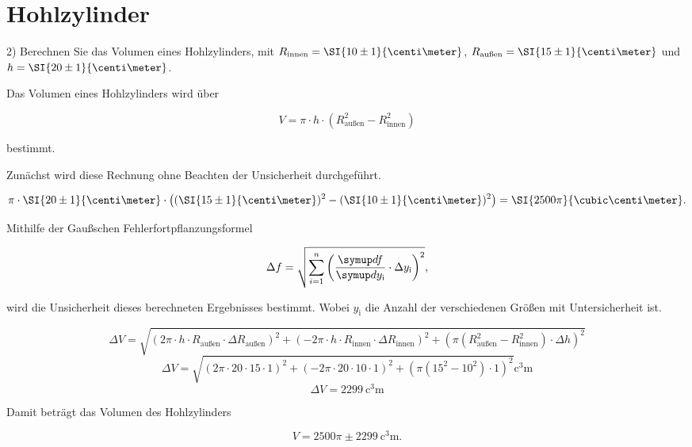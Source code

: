 \section{Hohlzylinder}
\label{sec:2}

2) Berechnen Sie das Volumen eines Hohlzylinders, mit $R_\text{innen} = \SI{10 \pm 1}{\centi\meter}$, $R_\text{außen} = \SI{15 \pm 1}{\centi\meter}$ und $h = \SI{20 \pm 1}{\centi\meter}$.

Das Volumen eines Hohlzylinders wird über 

\begin{equation}
    V = \pi \cdot h \cdot \left(R_\text{außen}^2 - R_\text{innen}^2\right)
\end{equation}

bestimmt. 

Zunächst wird diese Rechnung ohne Beachten der Unsicherheit durchgeführt.

\begin{equation}
    \pi \cdot \SI{20 \pm 1}{\centi\meter} \cdot \left((\SI{15 \pm 1}{\centi\meter})^2 - (\SI{10 \pm 1}{\centi\meter})^2\right) = \SI{2500 \pi}{\cubic\centi\meter}.
\end{equation}

Mithilfe der Gaußschen Fehlerfortpflanzungsformel

\begin{equation}
    \Delta f = \sqrt{\sum_{i = 1}^{n} \left(\frac{\dif{f}}{\dif{y_\text{i}}} \cdot \Delta y_\text{i}\right)^2}, 
\end{equation}

wird die Unsicherheit dieses berechneten Ergebnisses bestimmt.
Wobei $y_\text{i}$ die Anzahl der verschiedenen Größen mit Untersicherheit ist.

\begin{equation*}
    \Delta V = \sqrt{\left(2 \pi \cdot h \cdot R_\text{außen} \cdot \Delta R_\text{außen}\right)^2 + \left(-2 \pi \cdot h \cdot R_\text{innen} \cdot \Delta R_\text{innen}\right)^2 + \left(\pi \left(R_\text{außen}^2 - R_\text{innen}^2\right) \cdot \Delta h\right)^2} 
\end{equation*}
\begin{equation*}
    \Delta V = \sqrt{\left(2 \pi \cdot 20 \cdot 15 \cdot 1 \right)^2 + \left(-2 \pi \cdot 20 \cdot 10 \cdot 1\right)^2 + \left(\pi \left(15^2 - 10^2\right) \cdot 1\right)^2} \si{\cubic\centi\meter}
\end{equation*}
\begin{equation*}
    \Delta V = \SI{2299}{\cubic\centi\meter} 
\end{equation*}

Damit beträgt das Volumen des Hohlzylinders 

\begin{equation*}
    V = 2500 \pi \pm \SI{2299}{\cubic\centi\meter}.
\end{equation*}
